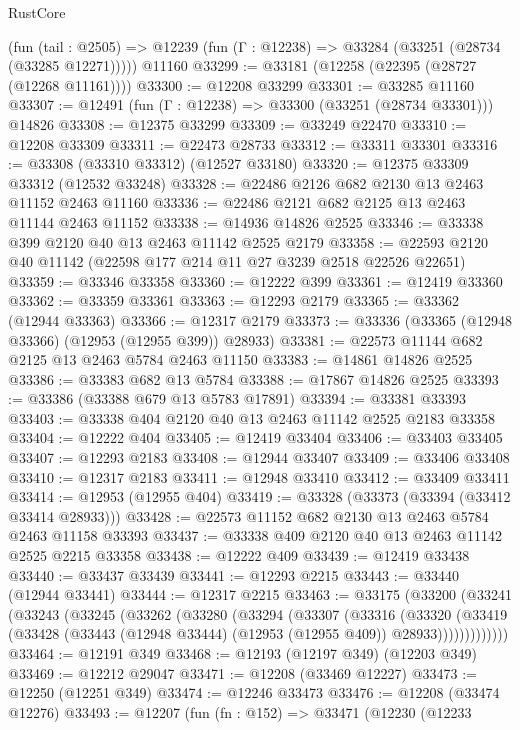 \begin{lexlean}{RustCore}
\begin{coremodule}
    (fun (tail : @2505) => @12239 (fun (Γ : @12238) => @33284 (@33251 (@28734 (@33285 @12271)))))
    @11160
@33299 := @33181 (@12258 (@22395 (@28727 (@12268 @11161))))
@33300 := @12208 @33299
@33301 := @33285 @11160
@33307 := @12491 (fun (Γ : @12238) => @33300 (@33251 (@28734 @33301))) @14826
@33308 := @12375 @33299
@33309 := @33249 @22470
@33310 := @12208 @33309
@33311 := @22473 @28733
@33312 := @33311 @33301
@33316 := @33308 (@33310 @33312) (@12527 @33180)
@33320 := @12375 @33309 @33312 (@12532 @33248)
@33328 := @22486 @2126 @682 @2130 @13 @2463 @11152 @2463 @11160
@33336 := @22486 @2121 @682 @2125 @13 @2463 @11144 @2463 @11152
@33338 := @14936 @14826 @2525
@33346 := @33338 @399 @2120 @40 @13 @2463 @11142 @2525 @2179
@33358 := @22593 @2120 @40 @11142 (@22598 @177 @214 @11 @27 @3239 @2518 @22526 @22651)
@33359 := @33346 @33358
@33360 := @12222 @399
@33361 := @12419 @33360
@33362 := @33359 @33361
@33363 := @12293 @2179
@33365 := @33362 (@12944 @33363)
@33366 := @12317 @2179
@33373 := @33336 (@33365 (@12948 @33366) (@12953 (@12955 @399)) @28933)
@33381 := @22573 @11144 @682 @2125 @13 @2463 @5784 @2463 @11150
@33383 := @14861 @14826 @2525
@33386 := @33383 @682 @13 @5784
@33388 := @17867 @14826 @2525
@33393 := @33386 (@33388 @679 @13 @5783 @17891)
@33394 := @33381 @33393
@33403 := @33338 @404 @2120 @40 @13 @2463 @11142 @2525 @2183 @33358
@33404 := @12222 @404
@33405 := @12419 @33404
@33406 := @33403 @33405
@33407 := @12293 @2183
@33408 := @12944 @33407
@33409 := @33406 @33408
@33410 := @12317 @2183
@33411 := @12948 @33410
@33412 := @33409 @33411
@33414 := @12953 (@12955 @404)
@33419 := @33328 (@33373 (@33394 (@33412 @33414 @28933)))
@33428 := @22573 @11152 @682 @2130 @13 @2463 @5784 @2463 @11158 @33393
@33437 := @33338 @409 @2120 @40 @13 @2463 @11142 @2525 @2215 @33358
@33438 := @12222 @409
@33439 := @12419 @33438
@33440 := @33437 @33439
@33441 := @12293 @2215
@33443 := @33440 (@12944 @33441)
@33444 := @12317 @2215
@33463 := @33175
    (@33200
      (@33241
        (@33243
          (@33245
            (@33262
              (@33280
                (@33294
                  (@33307
                    (@33316
                      (@33320
                        (@33419
                          (@33428 (@33443 (@12948 @33444) (@12953 (@12955 @409)) @28933)))))))))))))
@33464 := @12191 @349
@33468 := @12193 (@12197 @349) (@12203 @349)
@33469 := @12212 @29047
@33471 := @12208 (@33469 @12227)
@33473 := @12250 (@12251 @349)
@33474 := @12246 @33473
@33476 := @12208 (@33474 @12276)
@33493 := @12207
    (fun (fn : @152) =>
    @33471
      (@12230
        (@12233

\end{coremodule}
\end{lexlean}

